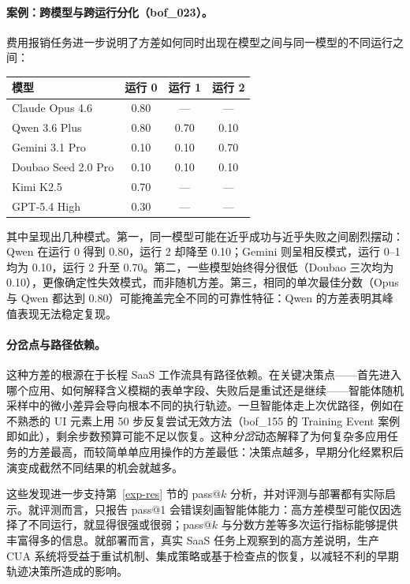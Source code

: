\paragraph{案例：跨模型与跨运行分化（{\ttfamily bof\_023}）。} 费用报销任务进一步说明了方差如何同时出现在模型之间与同一模型的不同运行之间：

\begin{table}[H]
\centering
\small
\begin{tabular}{lccc}
\toprule
\textbf{模型} & \textbf{运行 0} & \textbf{运行 1} & \textbf{运行 2} \\
\midrule
Claude Opus 4.6 & 0.80 & --- & --- \\
Qwen 3.6 Plus & 0.80 & 0.70 & 0.10 \\
Gemini 3.1 Pro & 0.10 & 0.10 & 0.70 \\
Doubao Seed 2.0 Pro & 0.10 & 0.10 & 0.10 \\
Kimi K2.5 & 0.70 & --- & --- \\
GPT-5.4 High & 0.30 & --- & --- \\
\bottomrule
\end{tabular}
\end{table}

其中呈现出几种模式。第一，同一模型可能在近乎成功与近乎失败之间剧烈摆动：Qwen 在运行 0 得到 0.80，运行 2 却降至 0.10；Gemini 则呈相反模式，运行 0--1 均为 0.10，运行 2 升至 0.70。第二，一些模型始终得分很低（Doubao 三次均为 0.10），更像确定性失效模式，而非随机方差。第三，相同的单次最佳分数（Opus 与 Qwen 都达到 0.80）可能掩盖完全不同的可靠性特征：Qwen 的方差表明其峰值表现无法稳定复现。

\paragraph{分岔点与路径依赖。} 这种方差的根源在于长程 SaaS 工作流具有路径依赖。在关键决策点——首先进入哪个应用、如何解释含义模糊的表单字段、失败后是重试还是继续——智能体随机采样中的微小差异会导向根本不同的执行轨迹。一旦智能体走上次优路径，例如在不熟悉的 UI 元素上用 50 步反复尝试无效方法（{\ttfamily bof\_155} 的 Training Event 案例即如此），剩余步数预算可能不足以恢复。这种\emph{分岔}动态解释了为何复杂多应用任务的方差最高，而较简单单应用操作的方差最低：决策点越多，早期分化经累积后演变成截然不同结果的机会就越多。

这些发现进一步支持第~\ref{exp-res} 节的 pass@$k$ 分析，并对评测与部署都有实际启示。就评测而言，只报告 pass@1 会错误刻画智能体能力：高方差模型可能仅因选择了不同运行，就显得很强或很弱；pass@$k$ 与分数方差等多次运行指标能够提供丰富得多的信息。就部署而言，真实 SaaS 任务上观察到的高方差说明，生产 CUA 系统将受益于重试机制、集成策略或基于检查点的恢复，以减轻不利的早期轨迹决策所造成的影响。
